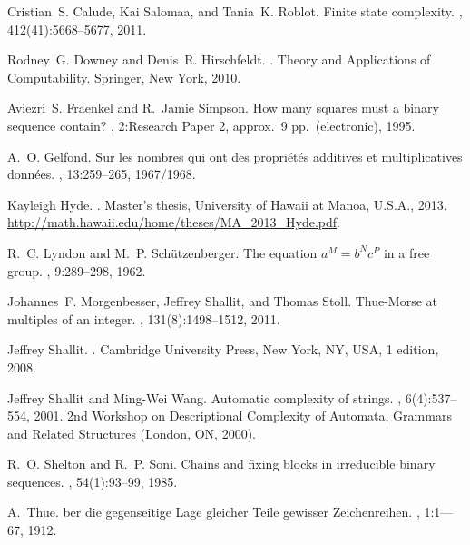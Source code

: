 \documentclass[12pt]{article}
\theoremstyle{plain}
\theoremstyle{definition}
\theoremstyle{remark}
\begin{document}
	\begin{thebibliography}{10}

	Cristian~S. Calude, Kai Salomaa, and Tania~K. Roblot.
	\newblock Finite state complexity.
	, 412(41):5668--5677, 2011.

	Rodney~G. Downey and Denis~R. Hirschfeldt.
	.
	\newblock Theory and Applications of Computability. Springer, New York, 2010.

	Aviezri~S. Fraenkel and R.~Jamie Simpson.
	\newblock How many squares must a binary sequence contain?
	, 2:Research Paper 2, approx.\ 9 pp.\
	  (electronic), 1995.

	A.~O. Gelfond.
	\newblock Sur les nombres qui ont des propri\'et\'es additives et
	  multiplicatives donn\'ees.
	, 13:259--265, 1967/1968.

	Kayleigh Hyde.
	.
	\newblock Master's thesis, University of Hawaii at Manoa, U.S.A., 2013.
	\newblock \url{http://math.hawaii.edu/home/theses/MA_2013_Hyde.pdf}.

	R.~C. Lyndon and M.~P. Sch{\"u}tzenberger.
	\newblock The equation {$a^{M}=b^{N}c^{P}$} in a free group.
	, 9:289--298, 1962.

	Johannes~F. Morgenbesser, Jeffrey Shallit, and Thomas Stoll.
	\newblock Thue-{M}orse at multiples of an integer.
	, 131(8):1498--1512, 2011.

	Jeffrey Shallit.
	.
	\newblock Cambridge University Press, New York, NY, USA, 1 edition, 2008.

	Jeffrey Shallit and Ming-Wei Wang.
	\newblock Automatic complexity of strings.
	, 6(4):537--554, 2001.
	\newblock 2nd Workshop on Descriptional Complexity of Automata, Grammars and
	  Related Structures (London, ON, 2000).

	R.~O. Shelton and R.~P. Soni.
	\newblock Chains and fixing blocks in irreducible binary sequences.
	\newblock {\em Discrete Math.}, 54(1):93--99, 1985.

	A.~Thue.
	ber die gegenseitige {L}age gleicher {T}eile gewisser
	  {Z}eichenreihen.
	, 1:1--–67,
	  1912.

	\end{thebibliography}
\end{document}
